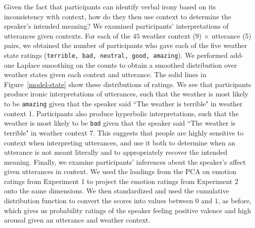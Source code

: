 \documentclass[10pt,letterpaper]{article}
\begin{document}


Given the fact that participants can identify verbal irony based on its inconsistency with context, how do they then use context to determine the speaker's intended meaning? We examined participants' interpretations of utterances given contexts. For each of the $45$ weather context (9) $\times$ utterance (5) pairs, we obtained the number of participants who gave each of the five weather state ratings (\texttt{terrible, bad, neutral, good, amazing}). We performed add-one Laplace smoothing on the counts to obtain a smoothed distribution over weather states given each context and utterance. The solid lines in Figure~\ref{model-state} show these distributions of ratings. We see that participants produce ironic interpretations of utterances, such that the weather is most likely to be \texttt{amazing} given that the speaker said ``The weather is terrible" in weather context 1. Participants also produce hyperbolic interpretations, such that the weather is most likely to be \texttt{bad} given that the speaker said ``The weather is terrible" in weather context 7. This suggests that people are highly sensitive to context when interpreting utterances, and use it both to determine when an utterance is not meant literally and to appropriately recover the intended meaning. 
%
Finally, we examine participants' inferences about the speaker's affect given utterances in context. We used the loadings from the PCA on emotion ratings from Experiment 1 to project the emotion ratings from Experiment 2 onto the same dimensions. We then standardized and used the cumulative distribution function to convert the scores into values between $0$ and $1$, as before, which gives us probability ratings of the speaker feeling positive valence and high arousal given an utterance and weather context.
\end{document}
